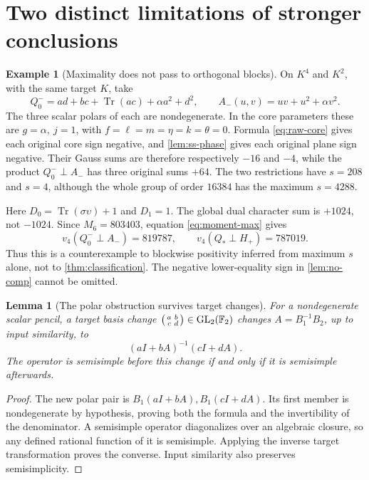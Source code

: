 \documentclass[11pt,a4paper]{article}
\newtheorem{lemma}[theorem]{Lemma}
\theoremstyle{definition}
\newtheorem{example}[theorem]{Example}
\theoremstyle{remark}
\numberwithin{equation}{section}
\newcommand{\F}{\mathbb F}
\newcommand{\Tr}{\operatorname{Tr}}
\newcommand{\GL}{\operatorname{GL}}
\newcommand{\vfour}{v_4}
\newcommand{\Qstar}{Q_*}
\newcommand{\Hp}{H_+}
\begin{document}
\section{Two distinct limitations of stronger conclusions}\label{sec:examples}
\begin{example}[Maximality does not pass to orthogonal blocks]
\label{ex:compensation}
On \(K^4\) and \(K^2\), with the same target \(K\), take
\[
 Q_0^-=ad+bc+\Tr(ac)+\alpha a^2+d^2,\qquad
 A_-(u,v)=uv+u^2+\alpha v^2.
\]
The three scalar polars of each are nondegenerate.
In the core parameters these are \(g=\alpha,\ j=1\), with
\(f=\ell=m=\eta=k=\theta=0\).
Formula \eqref{eq:raw-core} gives each original core sign negative,
and \cref{lem:ss-phase} gives each original plane sign negative.
Their Gauss sums are therefore respectively \(-16\) and \(-4\),
while the product \(Q_0^-\perp A_-\) has three original sums \(+64\).
The two restrictions have \(s=208\) and \(s=4\), although the whole
group of order \(16384\) has the maximum \(s=4288\).

Here \(D_0=\Tr(\sigma\upsilon)+1\) and \(D_1=1\).
The global dual character sum is \(+1024\), not \(-1024\).
Since \(M_6=803403\), equation \eqref{eq:moment-max} gives
\[
 \vfour(Q_0^-\perp A_-)=819787,\qquad
 \vfour(\Qstar\perp\Hp)=787019.
\]
Thus this is a counterexample to blockwise positivity inferred from
maximum \(s\) alone, not to \cref{thm:classification}.
The negative lower-equality sign in \cref{lem:no-comp} cannot be omitted.
\end{example}

\begin{lemma}[The polar obstruction survives target changes]
\label{lem:mobius}
For a nondegenerate scalar pencil, a target basis change
\(\begin{psmallmatrix}a&b\\c&d\end{psmallmatrix}\in\GL_2(\F_2)\)
changes \(A=B_1^{-1}B_2\), up to input similarity, to
\begin{equation}\label{eq:mobius}
 (aI+bA)^{-1}(cI+dA).
\end{equation}
The operator is semisimple before this change if and only if it is
semisimple afterwards.
\end{lemma}
\begin{proof}
The new polar pair is \(B_1(aI+bA), B_1(cI+dA)\).
Its first member is nondegenerate by hypothesis, proving both the
formula and the invertibility of the denominator.
A semisimple operator diagonalizes over an algebraic closure, so any
defined rational function of it is semisimple. Applying the inverse
target transformation proves the converse. Input similarity also
preserves semisimplicity.
\end{proof}
\end{document}
